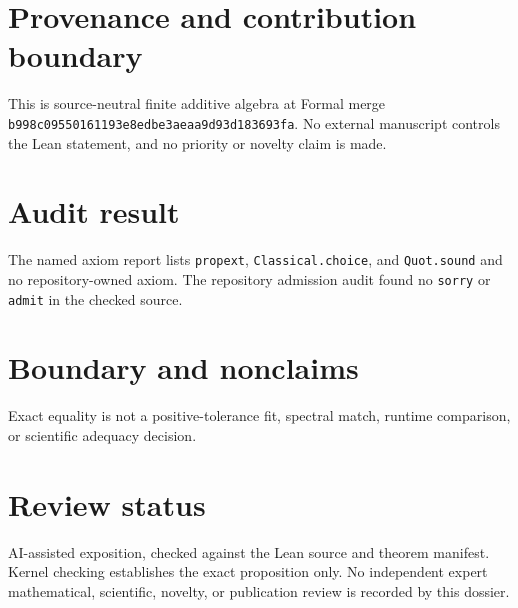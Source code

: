 \documentclass[11pt]{article}
\begin{document}
\section{Provenance and contribution boundary}
This is source-neutral finite additive algebra at Formal merge
\texttt{b998c09550161193e8edbe3aeaa9d93d183693fa}. No external manuscript controls the Lean
statement, and no priority or novelty claim is made.

\section{Audit result}
The named axiom report lists \texttt{propext}, \texttt{Classical.choice}, and
\texttt{Quot.sound} and no repository-owned axiom. The repository admission audit found no
\texttt{sorry} or \texttt{admit} in the checked source.

\section{Boundary and nonclaims}
Exact equality is not a positive-tolerance fit, spectral match, runtime comparison, or scientific
adequacy decision.

\section{Review status}
AI-assisted exposition, checked against the Lean source and theorem manifest. Kernel checking
establishes the exact proposition only. No independent expert mathematical, scientific,
novelty, or publication review is recorded by this dossier.
\end{document}
